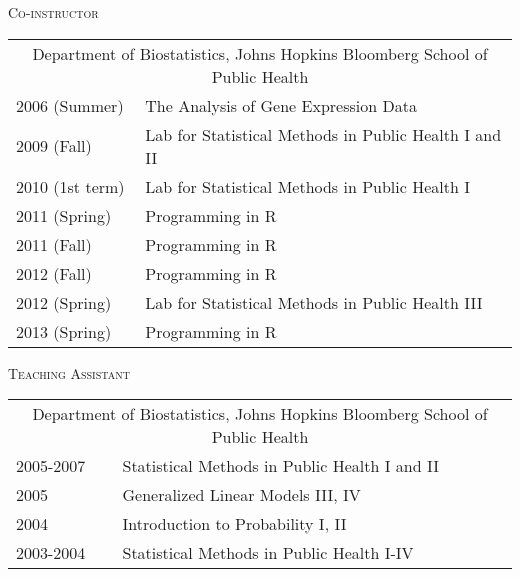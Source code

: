 \documentclass[11pt]{article}%
\newcommand{\R}{\textsf{R}}
\begin{document}
\vspace{4pt}

\noindent\textsc{Co-instructor}

\begin{tabular}{ll}
\multicolumn{2}{c}{Department of Biostatistics, Johns Hopkins
  Bloomberg School of Public Health}\\
2006 (Summer) & The Analysis of Gene Expression Data\\[2pt]
2009 (Fall) & Lab for Statistical Methods in Public Health I and II\\ [2pt]
2010 (1st term) & Lab for Statistical Methods in Public Health I
\\[2pt]
2011 (Spring) & Programming in \R{}  \\ [2pt]
2011 (Fall) & Programming in \R{}\\ [2pt]
2012 (Fall) & Programming in \R{}\\[2pt]
2012 (Spring) & Lab for Statistical Methods in Public Health III\\[2pt]
2013 (Spring) & Programming in \R{}\\
\end{tabular}

\vspace{4pt}

\noindent\textsc{Teaching Assistant}

\begin{tabular}{ll}
\multicolumn{2}{c}{Department of Biostatistics, Johns Hopkins
  Bloomberg School of Public Health}\\
2005-2007 & Statistical Methods in Public Health I and II\\
2005 & Generalized Linear Models III, IV\\
2004 & Introduction to Probability I, II\\
2003-2004 & Statistical Methods in Public Health I-IV\\[3pt]
\end{tabular}
\end{document}
